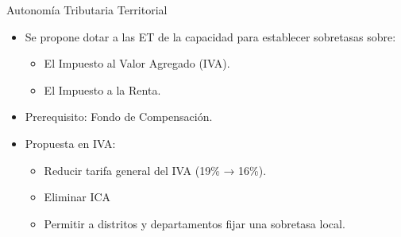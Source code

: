 \begin{frame}{Autonomía Tributaria Territorial}
\begin{itemize}
  \item Se propone dotar a las ET de la capacidad para establecer sobretasas sobre:
  \begin{itemize}
    \item El Impuesto al Valor Agregado (IVA).  
    \item El Impuesto a la Renta.  
  \end{itemize}
  \item Prerequisito: Fondo de Compensación.

  \item Propuesta en IVA:
  \begin{itemize}
    \item Reducir tarifa general del IVA (19\% → 16\%).
    \item Eliminar ICA
    \item Permitir a distritos y departamentos fijar una sobretasa local.
  \end{itemize}
\end{itemize}
\end{frame}

